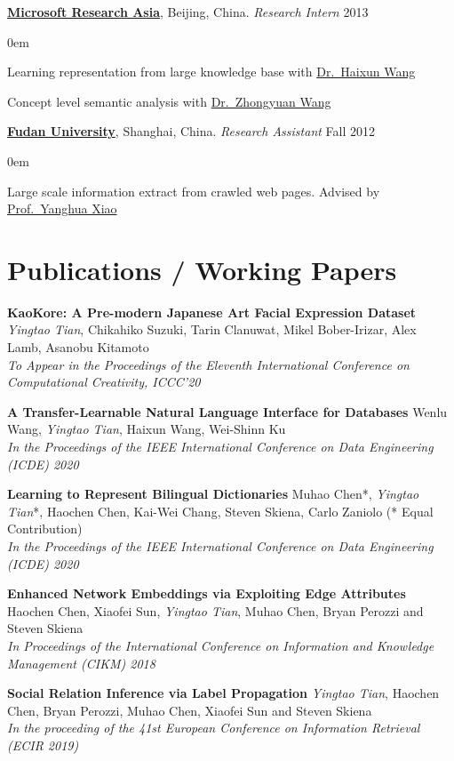 \documentclass[line,margin]{cv}
\newenvironment{block}
{
	\begin{addmargin}[2em]{0em}%
}
{
	\end{addmargin}
}
\newcommand{\Fudan}{\href{http://www.fudan.edu.cn/englishnew/}{Fudan University}}
\newcommand{\MSRA}{\href{http://research.microsoft.com/en-us/labs/asia/default.aspx}{Microsoft Research Asia}}
\newcommand{\Haixun}{\href{http://haixun.olidu.com/}{Dr.\ Haixun Wang}}
\newcommand{\Zhongyuan}{\href{http://www.wangzhongyuan.com/}{Dr.\ Zhongyuan Wang}}
\newcommand{\Yanghua}{\href{http://gdm.fudan.edu.cn/GDMWiki/Wiki.jsp?page=Yanghuaxiao}{Prof.\ Yanghua Xiao}}
\begin{document}
\begin{resume}
	{\bf \MSRA}, Beijing, China. {\itshape Research Intern} \hfill 2013

	\begin{block}
		Learning representation from large knowledge base with \Haixun

		Concept level semantic analysis with \Zhongyuan
	\end{block}

	{\bf \Fudan}, Shanghai, China. {\itshape Research Assistant} \hfill Fall 2012
	\begin{block}
		Large scale information extract from crawled web pages. Advised by \Yanghua
	\end{block}


\section{Publications / Working Papers}
	{\bf  KaoKore: A Pre-modern Japanese Art Facial Expression Dataset}
	\emph{Yingtao Tian}, Chikahiko Suzuki, Tarin Clanuwat, Mikel Bober-Irizar, Alex Lamb, Asanobu Kitamoto\\
	\emph{To Appear in the Proceedings of the Eleventh International Conference on Computational Creativity, ICCC'20}

	{\bf  A Transfer-Learnable Natural Language Interface for Databases}
	Wenlu Wang, \emph{Yingtao Tian}, Haixun Wang, Wei-Shinn Ku\\
	\emph{In the Proceedings of the IEEE International Conference on Data Engineering (ICDE) 2020}
	
	{\bf  Learning to Represent Bilingual Dictionaries}
	Muhao Chen*, \emph{Yingtao Tian}*, Haochen Chen, Kai-Wei Chang, Steven Skiena, Carlo Zaniolo  (* Equal Contribution)\\
	\emph{In the Proceedings of the IEEE International Conference on Data Engineering (ICDE) 2020}
	
	{\bf  Enhanced Network Embeddings via Exploiting Edge Attributes}
	 Haochen Chen, Xiaofei Sun, \emph{Yingtao Tian}, Muhao Chen, Bryan Perozzi and Steven Skiena\\
	\emph{In Proceedings of the International Conference on Information and Knowledge Management (CIKM) 2018}

	{\bf Social Relation Inference via Label Propagation}
	\emph{Yingtao Tian}, Haochen Chen, Bryan Perozzi, Muhao Chen, Xiaofei Sun and Steven Skiena\\
	\emph{In the proceeding of the 41st European Conference on Information Retrieval (ECIR 2019)}
	

\end{resume}
\end{document}

